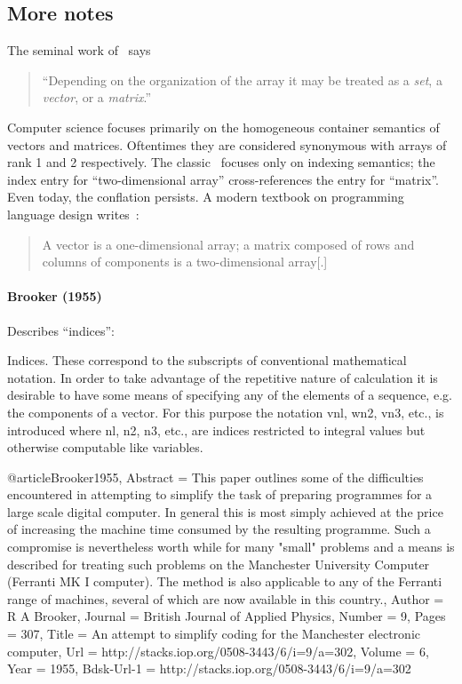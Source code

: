 \subsection{More notes}

The seminal work of~\cite{Iliffe1961} says
%
\begin{quote}
``Depending on the organization of the array it may
be treated as a \textit{set}, a \textit{vector}, or a \textit{matrix}.''
\end{quote}


Computer science focuses primarily on the homogeneous container semantics of
vectors and matrices. Oftentimes they are considered synonymous with arrays of
rank 1 and 2 respectively.
%
The classic~\cite{Knuth1967} focuses only on indexing semantics; the index
entry for ``two-dimensional array'' cross-references the entry for ``matrix''.
Even today, the conflation persists. A modern textbook on programming language
design writes~\cite[p. 215]{Pratt2001}:
%
\begin{quote}
A vector is a one-dimensional array; a matrix composed of rows and columns of
components is a two-dimensional array[.]
\end{quote}



\paragraph{Brooker (1955)}

Describes ``indices'':

Indices. These correspond to the subscripts of conventional
mathematical notation. In order to take advantage
of the repetitive nature of calculation it is desirable to have
some means of specifying any of the elements of a sequence,
e.g. the components of a vector. For this purpose the notation
vnl, wn2, vn3, etc., is introduced where nl, n2, n3, etc., are
indices restricted to integral values but otherwise computable
like variables. 

@article{Brooker1955,
	Abstract = {This paper outlines some of the difficulties encountered in attempting to simplify the task of preparing programmes for a large scale digital computer. In general this is most simply achieved at the price of increasing the machine time consumed by the resulting programme. Such a compromise is nevertheless worth while for many "small" problems and a means is described for treating such problems on the Manchester University Computer (Ferranti MK I computer). The method is also applicable to any of the Ferranti range of machines, several of which are now available in this country.},
	Author = {R A Brooker},
	Journal = {British Journal of Applied Physics},
	Number = {9},
	Pages = {307},
	Title = {An attempt to simplify coding for the Manchester electronic computer},
	Url = {http://stacks.iop.org/0508-3443/6/i=9/a=302},
	Volume = {6},
	Year = {1955},
	Bdsk-Url-1 = {http://stacks.iop.org/0508-3443/6/i=9/a=302}}

